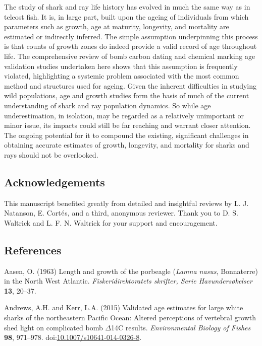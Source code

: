 \documentclass[]{article}
\begin{document}
The study of shark and ray life history has evolved in much the same way
as in teleost fish. It is, in large part, built upon the ageing of
individuals from which parameters such as growth, age at maturity,
longevity, and mortality are estimated or indirectly inferred. The
simple assumption underpinning this process is that counts of growth
zones do indeed provide a valid record of age throughout life. The
comprehensive review of bomb carbon dating and chemical marking age
validation studies undertaken here shows that this assumption is
frequently violated, highlighting a systemic problem associated with the
most common method and structures used for ageing. Given the inherent
difficulties in studying wild populations, age and growth studies form
the basis of much of the current understanding of shark and ray
population dynamics. So while age underestimation, in isolation, may be
regarded as a relatively unimportant or minor issue, its impacts could
still be far reaching and warrant closer attention. The ongoing
potential for it to compound the existing, significant challenges in
obtaining accurate estimates of growth, longevity, and mortality for
sharks and rays should not be overlooked.

\subsection{Acknowledgements}\label{acknowledgements}

This manuscript benefited greatly from detailed and insightful reviews
by L. J. Natanson, E. Cort\(\acute{\textup{e}}\)s, and a third,
anonymous reviewer. Thank you to D. S. Waltrick and L. F. N. Waltrick
for your support and encouragement.

\newpage

\subsection*{References}\label{references}

\hypertarget{refs}{}
\hypertarget{ref-aasen_length_1963}{}
Aasen, O. (1963) Length and growth of the porbeagle (\emph{Lamna nasus},
Bonnaterre) in the North West Atlantic. \emph{Fiskeridirektoratets
skrifter, Serie Havundersøkelser} \textbf{13}, 20--37.

\hypertarget{ref-andrews_validated_2015}{}
Andrews, A.H. and Kerr, L.A. (2015) Validated age estimates for large
white sharks of the northeastern Pacific Ocean: Altered perceptions of
vertebral growth shed light on complicated bomb \(\Delta\)14C results.
\emph{Environmental Biology of Fishes} \textbf{98}, 971--978.
doi:\href{https://doi.org/10.1007/s10641-014-0326-8}{10.1007/s10641-014-0326-8}.
\end{document}
